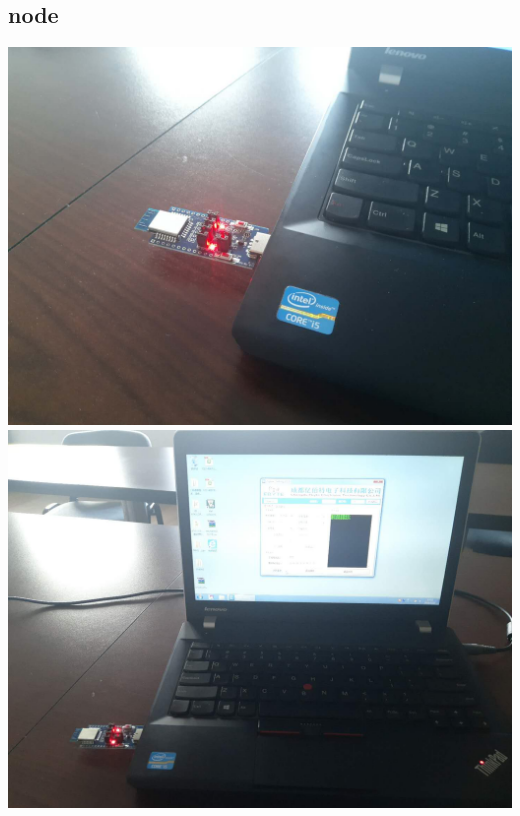 \documentclass[12pt]{article}
\begin{document}
\begin{CJK}{UTF8}{gbsn}
\section{node}
  \includegraphics[width=\textwidth]{./aNode.jpg}
  \includegraphics[width=\textwidth]{./aNodeWithlaptop.jpg}

\end{CJK}
\end{document}
